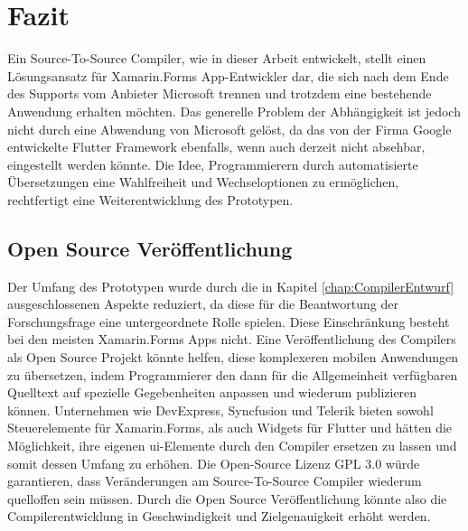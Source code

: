 \chapter{Fazit}
\label{chap:FazitAusblick}
Ein Source-To-Source Compiler,  wie in dieser Arbeit entwickelt, stellt einen Lösungsansatz für Xamarin.Forms App-Entwickler dar,  die sich nach dem Ende des Supports vom Anbieter Microsoft trennen und trotzdem eine bestehende Anwendung erhalten möchten.  Das generelle Problem der Abhängigkeit ist jedoch nicht durch eine Abwendung von Microsoft gelöst, da das von der Firma Google entwickelte Flutter Framework ebenfalls, wenn auch derzeit nicht absehbar,  eingestellt werden könnte.  Die Idee,  Programmierern durch automatisierte Übersetzungen eine Wahlfreiheit und Wechseloptionen zu ermöglichen, rechtfertigt eine Weiterentwicklung des Prototypen.

\section{Open Source Veröffentlichung}

Der Umfang des Prototypen wurde durch die in Kapitel \ref{chap:CompilerEntwurf} ausgeschlossenen Aspekte reduziert,  da diese für die Beantwortung der Forschungsfrage eine untergeordnete Rolle spielen.  Diese Einschränkung besteht bei den meisten Xamarin.Forms Apps nicht.  
Eine Veröffentlichung des Compilers als Open Source Projekt könnte helfen, diese komplexeren 
mobilen Anwendungen zu übersetzen,  indem Programmierer den dann für die Allgemeinheit verfügbaren Quelltext auf spezielle Gegebenheiten anpassen und wiederum publizieren können.  Unternehmen wie DevExpress,  Syncfusion und Telerik bieten sowohl Steuerelemente für 
Xamarin.Forms,  als auch Widgets für Flutter und hätten die Möglichkeit,  ihre eigenen \ac{ui}-Elemente 
durch den Compiler ersetzen zu lassen und somit dessen Umfang zu erhöhen.  Die Open-Source Lizenz GPL 3.0 würde garantieren,  dass Veränderungen am Source-To-Source Compiler wiederum quelloffen sein müssen.  Durch die Open Source Veröffentlichung könnte also die Compilerentwicklung in Geschwindigkeit und Zielgenauigkeit erhöht werden.

